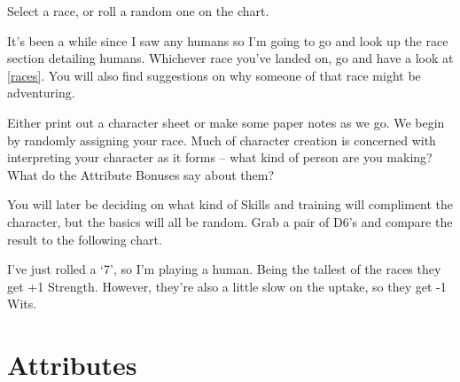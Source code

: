 \begin{multicols}{2}

\noindent
Select a race, or roll a random one on the chart.


\racechart

It's been a while since I saw any humans so I'm going to go and look up the race section detailing humans.
Whichever race you've landed on, go and have a look at \autoref{races}.
You will also find suggestions on why someone of that race might be adventuring.

Either print out a character sheet or make some paper notes as we go.
We begin by randomly assigning your race.
Much of character creation is concerned with interpreting your character as it forms -- what kind of person are you making?
What do the Attribute Bonuses say about them?

You will later be deciding on what kind of Skills and training will compliment the character, but the basics will all be random.
Grab a pair of D6's and compare the result to the following chart.

I've just rolled a `7', so I'm playing a human.  Being the tallest of the races they get +1 Strength.  However, they're also a little slow on the uptake, so they get -1 Wits.


\end{multicols}

\pagebreak

\section{Attributes}
\label{randomAttributes}

